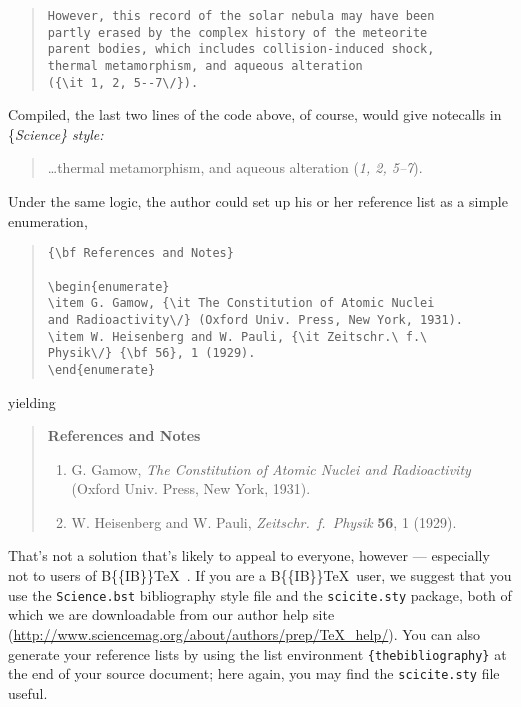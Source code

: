 \documentclass[12pt]{article}
\begin{document}
\begin{quote}
\begin{verbatim}
However, this record of the solar nebula may have been
partly erased by the complex history of the meteorite
parent bodies, which includes collision-induced shock,
thermal metamorphism, and aqueous alteration
({\it 1, 2, 5--7\/}).
\end{verbatim}
\end{quote}

\noindent Compiled, the last two lines of the code above, of course,
would give notecalls in \{\it Science\/\} style:

\begin{quote}
\ldots thermal metamorphism, and aqueous alteration ({\it 1, 2, 5--7\/}).
\end{quote}

Under the same logic, the author could set up his or her reference list
as a simple enumeration,

\begin{quote}
\begin{verbatim}
{\bf References and Notes}

\begin{enumerate}
\item G. Gamow, {\it The Constitution of Atomic Nuclei
and Radioactivity\/} (Oxford Univ. Press, New York, 1931).
\item W. Heisenberg and W. Pauli, {\it Zeitschr.\ f.\ 
Physik\/} {\bf 56}, 1 (1929).
\end{enumerate}
\end{verbatim}
\end{quote}

\noindent yielding

\begin{quote}
{\bf References and Notes}

\begin{enumerate}
\item G. Gamow, {\it The Constitution of Atomic Nuclei and
Radioactivity\/} (Oxford Univ. Press, New York, 1931).
\item W. Heisenberg and W. Pauli, {\it Zeitschr.\ f.\ Physik} {\bf 56},
1 (1929).
\end{enumerate}
\end{quote}

That's not a solution that's likely to appeal to everyone, however ---
especially not to users of B\{\small\{IB\}\}\TeX~\cite{inclme}. If you
are a B\{\small\{IB\}\}\TeX~user, we suggest that you use the
\texttt{Science.bst} bibliography style file and the
\texttt{scicite.sty} package, both of which we are downloadable from our
author help site
(\url{http://www.sciencemag.org/about/authors/prep/TeX_help/}). You can
also generate your reference lists by using the list environment
\texttt{\{thebibliography\}} at the end of your source document; here
again, you may find the \texttt{scicite.sty} file useful.
\end{document}
